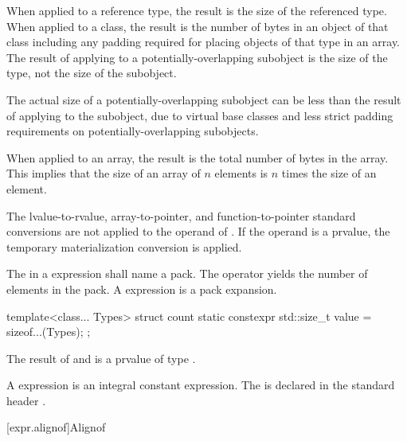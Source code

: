 \pnum
{}%
When applied to a reference type, the result is the size
of the referenced type.
%
When applied to a class, the result is the number of bytes in an object
of that class including any padding required for placing objects of that
type in an array.
The result of applying  to a
potentially-overlapping subobject is
the size of the type, not the size of the subobject.
\begin{footnote}
The actual size of a potentially-overlapping subobject
can be less than the result of
applying  to the subobject, due to virtual base classes
and less strict padding requirements on potentially-overlapping subobjects.
\end{footnote}
%
When applied to an array, the result is the total number of bytes in the
array. This implies that the size of an array of $n$ elements is
$n$ times the size of an element.

\pnum
The lvalue-to-rvalue,
array-to-pointer, and
function-to-pointer standard conversions are not
applied to the operand of .
If the operand is a prvalue,
the temporary materialization conversion
is applied.

\pnum
The  in a  expression shall name a
pack. The  operator yields the number of elements
in the pack.
A  expression is a pack expansion.
\begin{example}
\begin{codeblock}
template<class... Types>
struct count {
  static constexpr std::size_t value = sizeof...(Types);
};
\end{codeblock}
\end{example}

\pnum
{}%
%
The result of  and  is a prvalue of type
.
\begin{note}
A  expression
is an integral constant expression.
The   is declared in the standard header
.
\end{note}

[expr.alignof]{Alignof}

